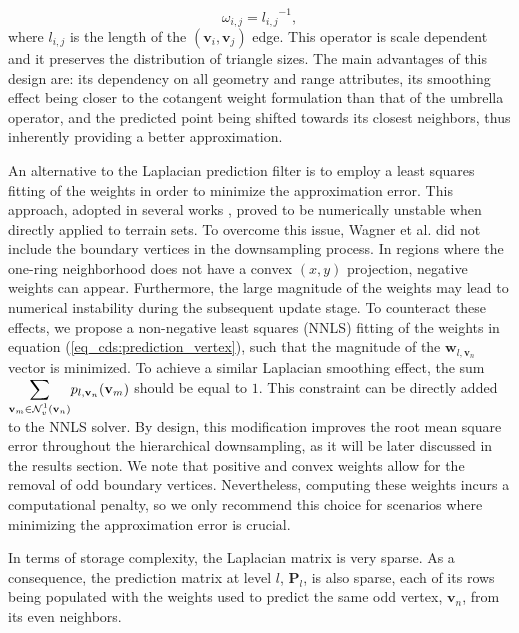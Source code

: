 \documentclass[graybox]{svmult}
\begin{document}
	\begin{equation}
	\omega_{i,j} = {l_{i,j}}^{-1}, 
	\label{eq_cds:fujiwara}
	\end{equation}
	where $l_{i,j}$ is the length of the $(\mathbf{v}_i,\mathbf{v}_j)$ edge. This operator is scale dependent and it preserves the distribution of triangle sizes. The main advantages of this design are: its dependency on all geometry and range attributes, its smoothing effect being closer to the cotangent weight formulation than that of the umbrella operator, and the predicted point being shifted towards its closest neighbors, thus inherently providing a better approximation.
	
	An alternative to the Laplacian prediction filter is to employ a least squares fitting of the weights in order to minimize the approximation error. This approach, adopted in several works \cite{Wagner2005,Martinez2011}, proved to be numerically unstable when directly applied to terrain sets. To overcome this issue, Wagner et al. \cite{Wagner2005} did not include the boundary vertices in the downsampling process. In regions where the one-ring neighborhood does not have a convex  $(x,y)$ projection, negative weights can appear. Furthermore, the large magnitude of the weights may lead to numerical instability during the subsequent update stage. To counteract these effects, we propose  a non-negative least squares (NNLS) fitting of the weights in equation (\ref{eq_cds:prediction_vertex}), such that
	the magnitude of the $\mathbf{w}_{l, \mathbf{v}_n}$ vector is minimized. To achieve a similar Laplacian smoothing effect, the sum $\mathlarger{\sum}_{\mathbf{v}_m \in \mathcal{N}_v^1(\mathbf{v}_n)}{ p_{l, \mathbf{v}_n}(\mathbf{v}_m)}$ should be equal to $1$. This constraint can be directly added to the NNLS solver. By design, this modification improves the root mean square error throughout the hierarchical downsampling, as it will be later discussed in the results section. We note that positive and convex weights allow for the removal of odd boundary vertices. Nevertheless, computing these weights incurs a computational penalty, so we only recommend this choice for scenarios where minimizing the approximation error is crucial.
	
	In terms of storage complexity,  the Laplacian matrix is very sparse. As a consequence, the prediction matrix at level $l$, $\mathbf{P}_l$, is also sparse, each of its rows being populated with the weights used to predict the same odd vertex,
	$\mathbf{v}_n$, from its even neighbors.
	
\end{document}
